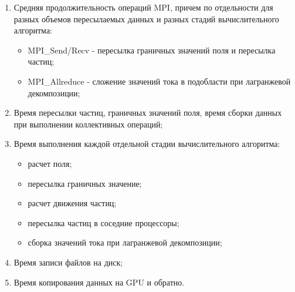 \begin{enumerate}
	\item Средняя продолжительность операций MPI, причем по отдельности для разных объемов пересылаемых данных и разных стадий вычислительного алгоритма:
	\begin{itemize}
		\item MPI\_Send/Recv - пересылка граничных значений поля и пересылка частиц;
		\item MPI\_Allreduce - сложение значений тока в подобласти при лагранжевой декомпозиции;
		
	\end{itemize}	
	\item Время пересылки частиц, граничных значений поля, время сборки данных при выполнении коллективных операций;   
	\item Время выполнения каждой отдельной стадии вычислительного алгоритма:
	\begin{itemize}
		\item расчет поля; 
		\item пересылка граничных значение; 
		\item расчет движения частиц; 
		\item пересылка частиц в соседние процессоры; 
		\item сборка значений тока при лагранжевой декомпозиции;
	\end{itemize}
	\item Время записи файлов на диск;
	\item Время копирования данных на GPU и обратно.
	
\end{enumerate}



